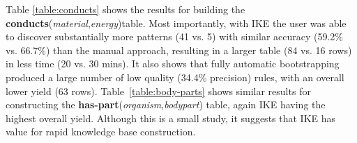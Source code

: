 \documentclass[11pt,letterpaper]{article}
\newcommand{\pred}{\bf}
\begin{document}
\begin{table}[tbh]
\centering
\boldmath
{}
\caption{{\pred has-part}({\it organism},{\it bodypart}) table: Again, IKE produces the highest yield by helping the user discover substantially more (21) high-precision (57.4\%) patterns.}
\label{table:body-parts}
\end{table}


Table \ref{table:conducts} shows the results for building the {\pred conducts}({\it material},{\it energy})table. Most importantly, with IKE the user was able to discover substantially more patterns (41 vs. 5) with similar accuracy (59.2\% vs. 66.7\%) than the manual approach, resulting in a larger table (84 vs. 16 rows) in less time (20 vs. 30 mins). It also shows that fully automatic bootstrapping produced a large number of low quality (34.4\% precision) rules, with an overall lower yield (63 rows). 
Table~\ref{table:body-parts} shows similar results for constructing the {\pred has-part}({\it organism},{\it bodypart}) table, again IKE having the highest overall yield.
Although this is a small study, it suggests that IKE has value for rapid knowledge base construction.
\end{document}
